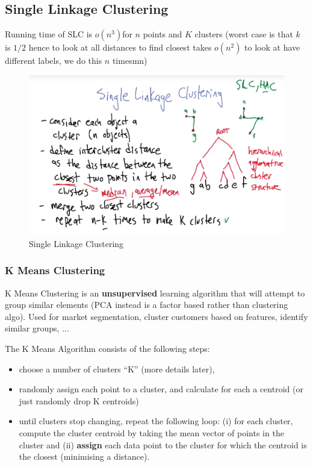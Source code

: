 \documentclass[11pt]{article}
\begin{document}
\subsection{Single Linkage Clustering}
Running time of SLC is $o(n^3)$for $n$ points and $K$ clusters (worst case is that $k$ is $1/2$ hence to look at all distances to find closest takes $o(n^2)$ to look at have different labels, we do this $n$ timesmn)

\begin{figure}[htbp] 
	\centering
	\includegraphics[width=.9\textwidth]{pics/SLC}
	\caption{Single Linkage Clustering} 
	\label{SLC}
\end{figure}


\subsubsection{K Means Clustering}
K Means Clustering is an \textbf{unsupervised} learning algorithm that will attempt to group similar elements (PCA instead is a factor based rather than clustering algo). Used for market segmentation, cluster customers based on features, identify similar groups, ...

The K Means Algorithm consists of the following steps:
\begin{itemize}
	\item choose a number of clusters “K” (more details later),
	\item randomly assign each point to a cluster, and calculate for each a centroid (or just randomly drop K centroids)
	\item until clusters stop changing, repeat the following loop: (i) for each cluster, compute the cluster centroid by taking the mean vector of points in the cluster and (ii) \textbf{assign} each data point to the cluster for which the centroid is the closest (minimising a distance).
\end{itemize}
\end{document}
